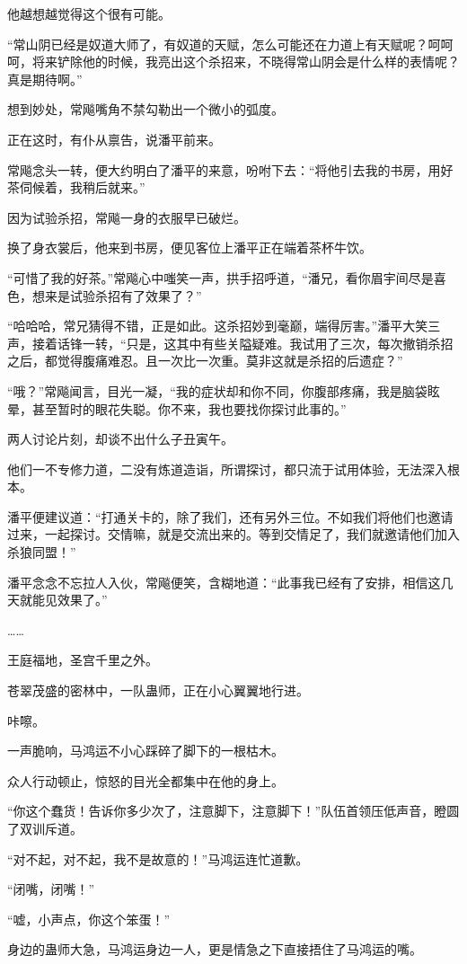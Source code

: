 \begin{this_body}
他越想越觉得这个很有可能。

“常山阴已经是奴道大师了，有奴道的天赋，怎么可能还在力道上有天赋呢？呵呵呵，将来铲除他的时候，我亮出这个杀招来，不晓得常山阴会是什么样的表情呢？真是期待啊。”

想到妙处，常飚嘴角不禁勾勒出一个微小的弧度。

正在这时，有仆从禀告，说潘平前来。

常飚念头一转，便大约明白了潘平的来意，吩咐下去：“将他引去我的书房，用好茶伺候着，我稍后就来。”

因为试验杀招，常飚一身的衣服早已破烂。

换了身衣裳后，他来到书房，便见客位上潘平正在端着茶杯牛饮。

“可惜了我的好茶。”常飚心中嗤笑一声，拱手招呼道，“潘兄，看你眉宇间尽是喜色，想来是试验杀招有了效果了？”

“哈哈哈，常兄猜得不错，正是如此。这杀招妙到毫巅，端得厉害。”潘平大笑三声，接着话锋一转，“只是，这其中有些关隘疑难。我试用了三次，每次撤销杀招之后，都觉得腹痛难忍。且一次比一次重。莫非这就是杀招的后遗症？”

“哦？”常飚闻言，目光一凝，“我的症状却和你不同，你腹部疼痛，我是脑袋眩晕，甚至暂时的眼花失聪。你不来，我也要找你探讨此事的。”

两人讨论片刻，却谈不出什么子丑寅午。

他们一不专修力道，二没有炼道造诣，所谓探讨，都只流于试用体验，无法深入根本。

潘平便建议道：“打通关卡的，除了我们，还有另外三位。不如我们将他们也邀请过来，一起探讨。交情嘛，就是交流出来的。等到交情足了，我们就邀请他们加入杀狼同盟！”

潘平念念不忘拉人入伙，常飚便笑，含糊地道：“此事我已经有了安排，相信这几天就能见效果了。”

……

王庭福地，圣宫千里之外。

苍翠茂盛的密林中，一队蛊师，正在小心翼翼地行进。

咔嚓。

一声脆响，马鸿运不小心踩碎了脚下的一根枯木。

众人行动顿止，惊怒的目光全都集中在他的身上。

“你这个蠢货！告诉你多少次了，注意脚下，注意脚下！”队伍首领压低声音，瞪圆了双训斥道。

“对不起，对不起，我不是故意的！”马鸿运连忙道歉。

“闭嘴，闭嘴！”

“嘘，小声点，你这个笨蛋！”

身边的蛊师大急，马鸿运身边一人，更是情急之下直接捂住了马鸿运的嘴。


\end{this_body}

